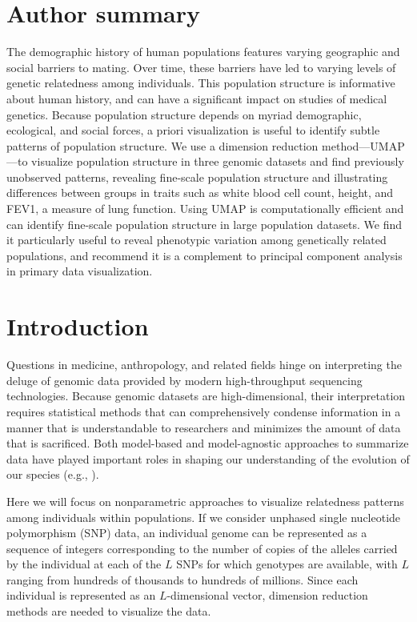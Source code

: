 \section{Author summary}

The demographic history of human populations features varying geographic and social barriers to mating. Over time, these barriers have led to varying levels of genetic relatedness among individuals.  This population structure is informative about human history, and can have a significant impact on studies of medical genetics. Because population structure depends on myriad demographic, ecological, and social forces, a priori visualization is useful to identify subtle patterns of population structure. We use a dimension reduction method---UMAP---to visualize population structure in three genomic datasets and find previously unobserved patterns, revealing fine-scale population structure and illustrating differences between groups in traits such as white blood cell count, height, and FEV1, a measure of lung function. Using UMAP is computationally efficient and can identify fine-scale population structure in large population datasets. We find it particularly useful to reveal phenotypic variation among genetically related populations, and recommend it is a complement  to principal component analysis in primary data visualization. 

\section{Introduction}
Questions in medicine, anthropology, and related fields hinge on interpreting the deluge of genomic data provided by modern high-throughput sequencing technologies. Because genomic datasets are high-dimensional, their interpretation requires statistical methods that can comprehensively condense information in a manner that is understandable to researchers and minimizes the amount of data that is sacrificed. Both model-based and model-agnostic approaches to summarize data have played important roles in shaping our understanding of the evolution of our species (e.g., \citep{lawson2012inference, novembre2016recent, spence2018inference, eigen2006, Hellenthal747}).

Here we will focus on nonparametric approaches to visualize relatedness patterns among individuals within populations. If we consider unphased single nucleotide polymorphism (SNP) data, an individual genome can be represented as a sequence of integers corresponding to the number of copies of the alleles carried by the individual at each of the $L$ SNPs for which genotypes are available, with $L$ ranging from hundreds of thousands to hundreds of millions. Since each individual is represented as an $L$-dimensional vector, dimension reduction methods are needed to visualize the data.


